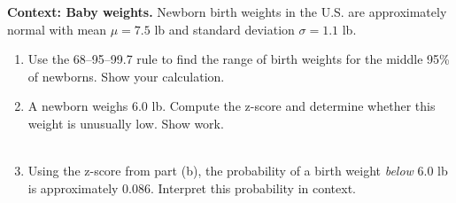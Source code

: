 \documentclass[10pt]{article}
\begin{document}
\namepartnerperiod

\vspace{0.15in}

\begin{tcolorbox}[colback=redbg, colframe=black!40, boxrule=0.6pt, arc=2mm,
    left=3mm, right=3mm, top=2mm, bottom=2mm, title=\textbf{Tier R --- Remediate}]
\textbf{Context: Baby weights.} Newborn birth weights in the U.S. are approximately
normal with mean $\mu = 7.5$ lb and standard deviation $\sigma = 1.1$ lb.

\begin{enumerate}
  \item Use the 68--95--99.7 rule to find the range of birth weights for the middle
        95\% of newborns. Show your calculation.
        \\
  \item A newborn weighs 6.0 lb. Compute the z-score and determine whether this weight
        is unusually low. Show work.
        \\
        \\
  \item Using the z-score from part (b), the probability of a birth weight \emph{below}
        6.0 lb is approximately 0.086. Interpret this probability in context.
        \ansline{}\\
\end{enumerate}
\end{tcolorbox}

\vspace{0.1in}
\end{document}
